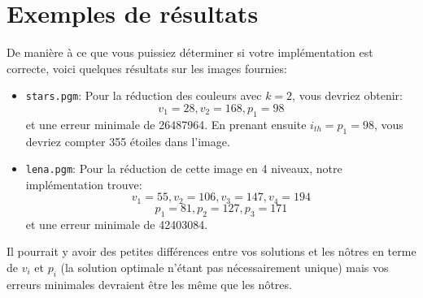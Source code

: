 \documentclass[a4paper,10pt]{article}
\begin{document}
\section*{Exemples de résultats}

De manière à ce que vous puissiez déterminer si votre implémentation
est correcte, voici quelques résultats sur les images fournies:
\begin{itemize}
\item \texttt{stars.pgm}: Pour la réduction des couleurs avec $k=2$, vous devriez obtenir:
$$v_1=28, v_2=168, p_1=98$$
et une erreur minimale de 26487964. En prenant ensuite $i_{th}=p_1=98$, vous devriez compter 355 étoiles dans l'image.
\item \texttt{lena.pgm}: Pour la réduction de cette image en 4 niveaux, notre implémentation trouve:
$$v_1=55, v_2=106, v_3=147, v_4=194$$
$$p_1=81, p_2=127, p_3=171$$ et une erreur minimale de 42403084.
\end{itemize}
Il pourrait y avoir des petites différences entre vos solutions et les
nôtres en terme de $v_i$ et $p_i$ (la solution optimale n'étant pas
nécessairement unique) mais vos erreurs minimales devraient être les
même que les nôtres.
\end{document}
